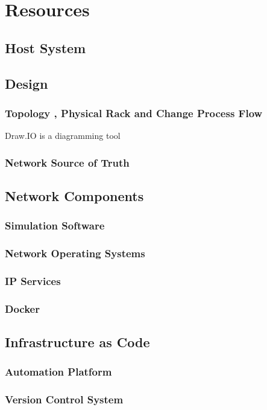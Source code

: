 \documentclass[12pt, letterpaper]{article}
\begin{document}
\newpage

\section{Resources}
	
	\subsection{Host System}
	
	\subsection{Design}
		\subsubsection{Topology , Physical Rack and Change Process Flow}
Draw.IO is a diagramming tool 
		\subsubsection{Network Source of Truth}
	
	\subsection{Network Components}
		\subsubsection{Simulation Software}
		\subsubsection{Network Operating Systems}
		\subsubsection{IP Services}
		\subsubsection{Docker}
		
	\subsection{Infrastructure as Code}
		\subsubsection{Automation Platform}
		\subsubsection{Version Control System}
\end{document}
